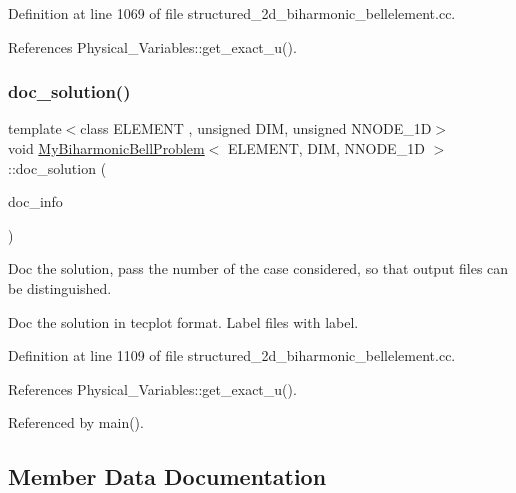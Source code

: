 Definition at line 1069 of file structured\+\_\+2d\+\_\+biharmonic\+\_\+bellelement.\+cc.



References Physical\+\_\+\+Variables\+::get\+\_\+exact\+\_\+u().

\mbox{\label{classMyBiharmonicBellProblem_ae361099fb498e9965ea37a648ce71032}} 
\subsubsection{\texorpdfstring{doc\+\_\+solution()}{doc\_solution()}}
{\footnotesize\ttfamily template$<$class E\+L\+E\+M\+E\+NT , unsigned D\+IM, unsigned N\+N\+O\+D\+E\+\_\+1D$>$ \\
void \hyperlink{classMyBiharmonicBellProblem}{My\+Biharmonic\+Bell\+Problem}$<$ E\+L\+E\+M\+E\+NT, D\+IM, N\+N\+O\+D\+E\+\_\+1D $>$\+::doc\+\_\+solution (\begin{DoxyParamCaption}\item[{Doc\+Info \&}]{doc\+\_\+info }\end{DoxyParamCaption})}



Doc the solution, pass the number of the case considered, so that output files can be distinguished. 

Doc the solution in tecplot format. Label files with label. 

Definition at line 1109 of file structured\+\_\+2d\+\_\+biharmonic\+\_\+bellelement.\+cc.



References Physical\+\_\+\+Variables\+::get\+\_\+exact\+\_\+u().



Referenced by main().



\subsection{Member Data Documentation}
\mbox{\label{classMyBiharmonicBellProblem_ac67539e5f625b52f2da8055599e2c72d}} 
